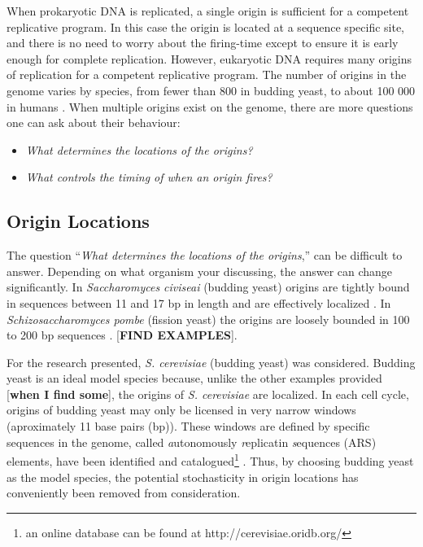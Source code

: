 	When prokaryotic DNA is replicated, a single origin is sufficient for a competent replicative program.
	In this case the origin is located at a sequence specific site, and there is no need to worry about the firing-time except to ensure it is early enough for complete replication.
	However, eukaryotic DNA requires many origins of replication for a competent replicative program.
	The number of origins in the genome varies by species, from fewer than 800 in budding yeast\cite{OriDB}, to about 100 000 in humans \cite{OriginsReview}.
	When multiple origins exist on the genome, there are more questions one can ask about their behaviour:
	\begin{itemize}
		\item \emph{What determines the locations of the origins?}
		\item \emph{What controls the timing of when an origin fires?}
	\end{itemize}
	
		\subsection{Origin Locations}
		
		The question ``\emph{What determines the locations of the origins},'' can be difficult to answer.
		Depending on what organism your discussing, the answer can change significantly.
		In \emph{Saccharomyces civiseai} (budding yeast) origins are tightly bound in sequences between 11 and 17 bp in length and are effectively localized \cite{ScottsPaper}.
		In \emph{Schizosaccharomyces pombe} (fission yeast) the origins are loosely bounded in 100 to 200 bp sequences \cite{OriginsReview}.
		[\textbf{FIND EXAMPLES}].
		
		For the research presented, \emph{S. cerevisiae} (budding yeast) was considered.
		Budding yeast is an ideal model species because, unlike the other examples provided [\textbf{when I find some}], the origins of \emph{S. cerevisiae} are localized.
		In each cell cycle, origins of budding yeast may only be licensed in very narrow windows (aproximately 11 base pairs (bp)).
		These windows are defined by specific sequences in the genome, called \emph{a}utonomously \emph{r}eplicatin \emph{s}equences (ARS) elements, have been identified and catalogued\footnote{an online database can be found at http://cerevisiae.oridb.org/} \cite{OriDB}.
		Thus, by choosing budding yeast as the model species, the potential stochasticity in origin locations has conveniently been removed from consideration.
		
